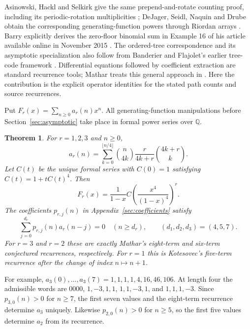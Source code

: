 \documentclass[11pt]{article}
\newtheorem{theorem}{Theorem}
\newcommand{\Q}{\mathbb{Q}}
\begin{document}
Asinowski, Hackl and Selkirk give the same prepend-and-rotate counting
proof, including its periodic-rotation multiplicities
\cite[Proposition 3, equation (2)]{ahs}; DeJager, Seidl, Naquin and Drube
obtain the corresponding generating-function powers through Riordan arrays
\cite[Corollary 11]{dejager}. Barry explicitly derives the zero-floor
binomial sum in Example 16 of his article available online in November
2015 \cite{barry}. The ordered-tree correspondence and its asymptotic
specialization also follow from Banderier and Flajolet's earlier
tree-code framework \cite[Examples 3 and 6]{bf}.
Differential equations followed by coefficient extraction are standard
recurrence tools; Mathar treats this general approach in \cite{mathar2021}.
Here the contribution is the explicit operator identities for the stated
path counts and source recurrences.

Put $F_r(x)=\sum_{n\geq0}a_r(n)x^n$. All generating-function manipulations
before Section~\ref{sec:asymptotic} take place in formal power series over $\Q$.

\begin{theorem}\label{thm:main}
For $r=1,2,3$ and $n\geq0$,
\begin{equation}\label{eq:count}
 a_r(n)=\sum_{k=0}^{\lfloor n/4\rfloor}\binom n{4k}
             \frac{r}{4k+r}\binom{4k+r}{k}.
\end{equation}
Let $C(t)$ be the unique formal series with $C(0)=1$ satisfying
$C(t)=1+tC(t)^4$. Then
\begin{equation}\label{eq:gf}
 F_r(x)=\frac1{1-x}C\!\left(\frac{x^4}{(1-x)^4}\right)^r.
\end{equation}
The coefficients $p_{r,j}(n)$ in Appendix~\ref{sec:coefficients} satisfy
\begin{equation}\label{eq:recurrences}
 \sum_{j=0}^{d_r}p_{r,j}(n)a_r(n-j)=0
 \quad(n\geq d_r),\qquad (d_1,d_2,d_3)=(4,5,7).
\end{equation}
For $r=3$ and $r=2$ these are exactly Mathar's eight-term and six-term
conjectured recurrences, respectively. For $r=1$ this is Kotesovec's
five-term recurrence after the change of index $n\mapsto n+1$.
\end{theorem}

For example, $a_3(0),\ldots,a_3(7)=1,1,1,1,4,16,46,106$.
At length four the admissible words are $0000$, $1,-3,1,1$,
$1,1,-3,1$, and $1,1,1,-3$. Since $p_{3,0}(n)>0$ for $n\geq7$,
the first seven values and the eight-term recurrence determine $a_3$ uniquely.
Likewise $p_{2,0}(n)>0$ for $n\geq5$, so the first five values determine
$a_2$ from its recurrence.
\end{document}

